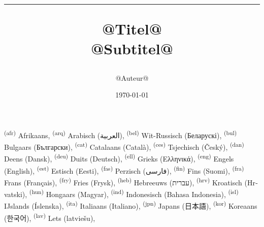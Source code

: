 \documentclass[onecolumn,a4paper,10pt]{report}
\begin{document}
\raggedbottom
\title{\color{kleur}\bfseries\Huge \begin{shaded*} \hrule @Titel@ %
\\[1ex] \large @Subtitel@ %
\end{shaded*}}
\author{\color{kleur}@Auteur@}
\vfill
\date{\color{kleur}\today{}}

\maketitle

\setcounter{page}{1}

\tableofcontents
\newpage
\setcounter{page}{1}
\textsuperscript{(afr)}  Afrikaans,
\textsuperscript{(arq)} Arabisch (\foreignlanguage{arabic}{العربية}),
\textsuperscript{(bel)}  Wit-Russisch (\foreignlanguage{belarusian}{Беларускі}),
\textsuperscript{(bul)}  Bulgaars (\foreignlanguage{bulgarian}{Български}),
\textsuperscript{(cat)} Catalaans (\foreignlanguage{catalan}{Català}),
\textsuperscript{(ces)}  Tsjechisch (\foreignlanguage{czech}{Český}),
\textsuperscript{(dan)}  Deens (\foreignlanguage{danish}{Dansk}),
\textsuperscript{(deu)}  Duits (\foreignlanguage{german}{Deutsch}),
\textsuperscript{(ell)}  Grieks (\foreignlanguage{greek}{Ελληνικά}),
\textsuperscript{(eng)}  Engels (\foreignlanguage{english}{English}),
\textsuperscript{(est)}  Estisch (\foreignlanguage{estonian}{Eesti}),
\textsuperscript{(fas)}  Perzisch (\foreignlanguage{persian}{فارسی}),
\textsuperscript{(fin)}  Fins (\foreignlanguage{finnish}{Suomi}),
\textsuperscript{(fra)}  Frans (\foreignlanguage{french}{Français}),
\textsuperscript{(fry)} Fries (Frysk),
\textsuperscript{(heb)}  Hebreeuws (\foreignlanguage{hebrew}{עברית}),
\textsuperscript{(hrv)}  Kroatisch (\foreignlanguage{croatian}{Hrvatski}),
\textsuperscript{(hun)}  Hongaars (\foreignlanguage{hungarian}{Magyar}),
\textsuperscript{(ind)}  Indonesisch (\foreignlanguage{malay}{Bahasa Indonesia}),
\textsuperscript{(isl)}  IJslands (\foreignlanguage{icelandic}{Íslenska}),
\textsuperscript{(ita)}  Italiaans (\foreignlanguage{italian}{Italiano}),
\textsuperscript{(jpn)}  Japans (\foreignlanguage{japanese}{日本語}),
\textsuperscript{(kor)}  Koreaans (\foreignlanguage{korean}{한국어}),
\textsuperscript{(lav)}  Lets (\foreignlanguage{latvian}{latviešu}),
\end{document}
